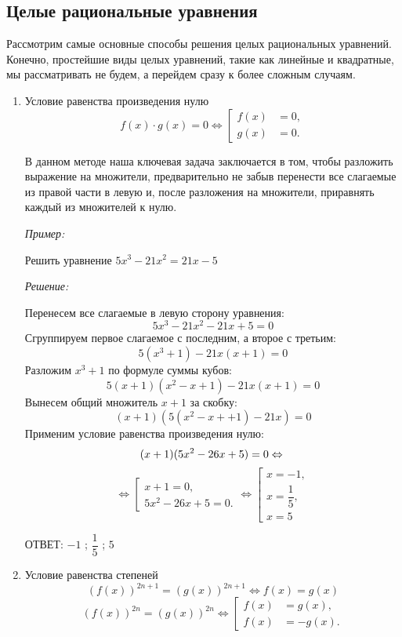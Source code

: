 \documentclass[12pt, a4paper]{article}
\begin{document}
\subsection*{Целые рациональные уравнения}
Рассмотрим самые основные способы решения целых рациональных уравнений. Конечно, простейшие виды целых уравнений, такие как линейные и квадратные, мы рассматривать не будем, а перейдем сразу к более сложным случаям.
\begin{enumerate}
	\item Условие равенства произведения нулю
	$$f(x)\cdot g(x) = 0
	\Leftrightarrow 
	\left[
	\begin{aligned}
		f(x)&=0,\\
		g(x)&=0.
	\end{aligned}
	\right.$$
	
	В данном методе наша ключевая задача заключается в том, чтобы разложить выражение на множители, предварительно не забыв перенести все слагаемые из правой части в левую и, после разложения на множители, приравнять каждый из множителей к нулю.
	
	\textit{Пример:}
	
	Решить уравнение $5x^3-21x^2=21x-5$
	
	\textit{Решение:}
	
	Перенесем все слагаемые в левую сторону уравнения:
	$$5x^3-21x^2-21x+5=0$$
	Сгруппируем первое слагаемое с последним, а второе с третьим:
	$$5(x^3+1)-21x(x+1)=0$$
	Разложим $x^3+1$ по формуле суммы кубов:
	$$5(x+1)(x^2-x+1)-21x(x+1)=0$$
	Вынесем общий множитель $x+1$ за скобку:
	$$(x+1)(5(x^2-x++1)-21x)=0$$
	Применим условие равенства произведения нулю:
	$$(x+1)(5x^2-26x+5)=0\Leftrightarrow\\$$
	$$\Leftrightarrow 
	\left[
	\begin{array}{l}
		x+1=0,\\
		5x^2-26x+5=0.
	\end{array}
	\right.
	\Leftrightarrow
	\left[
	\begin{array}{l}
		x=-1,\\
		x=\dfrac{1}{5},\\
		x=5
	\end{array}
	\right.$$
		
	ОТВЕТ: $-1$ ; $\dfrac{1}{5}$ ; $5$
	\item Условие равенства степеней
	$$(f(x))^{2n+1}=(g(x))^{2n+1}\Leftrightarrow f(x)=g(x)$$
	$$(f(x))^{2n}=(g(x))^{2n}
	\Leftrightarrow 
	\left[
	\begin{aligned}
		f(x)&=g(x),\\
		f(x)&=-g(x).
	\end{aligned}
	\right.$$
	

\end{enumerate}
\end{document}
